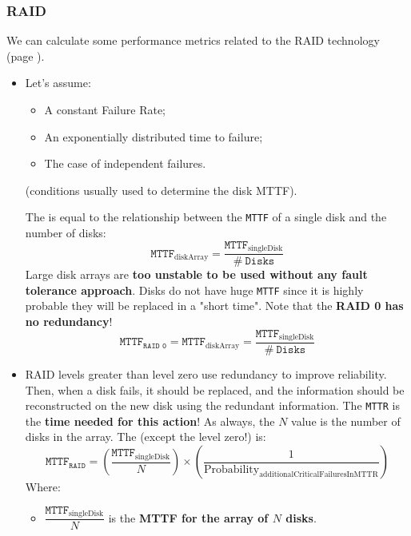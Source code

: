 \newpage

\subsubsection{RAID}

We can calculate some performance metrics related to the RAID technology (page \pageref{paragraph: RAID}).
\begin{itemize}
    \item Let's assume:
    \begin{itemize}
        \item A constant Failure Rate;
        \item An exponentially distributed time to failure;
        \item The case of independent failures.
    \end{itemize}
    (conditions usually used to determine the disk MTTF). 
    
    The  is equal to the relationship between the \texttt{MTTF} of a single disk and the number of disks:
    \begin{equation}\label{eq: Mean Time To Failure of a disk array}
        \texttt{MTTF}_{\text{diskArray}} = \dfrac{\texttt{MTTF}_{\text{singleDisk}}}{\# \: \texttt{Disks}}
    \end{equation}
    Large disk arrays are \textbf{too unstable to be used without any fault tolerance approach}. Disks do not have huge \texttt{MTTF} since it is highly probable they will be replaced in a "short time". Note that the \textbf{RAID 0 has no redundancy}!
    \begin{equation}
        \texttt{MTTF}_{\texttt{RAID 0}} = \texttt{MTTF}_{\text{diskArray}} = \dfrac{\texttt{MTTF}_{\text{singleDisk}}}{\# \: \texttt{Disks}}
    \end{equation}


    \item RAID levels greater than level zero use redundancy to improve reliability. Then, when a disk fails, it should be replaced, and the information should be reconstructed on the new disk using the redundant information. The \texttt{MTTR} is the \textbf{time needed for this action}! As always, the $N$ value is the number of disks in the array. The  (except the level zero!) is:
    \begin{equation}\label{eq: Mean Time To Failure of a RAID}
        \texttt{MTTF}_{\texttt{RAID}} = \left(\dfrac{\texttt{MTTF}_{\text{singleDisk}}}{N}\right) \times \left(\dfrac{1}{\text{Probability}_{\text{additionalCriticalFailuresInMTTR}}}\right)
    \end{equation}
    Where:
    \begin{itemize}
        \item $\dfrac{\texttt{MTTF}_{\text{singleDisk}}}{N}$ is the \textbf{MTTF for the array of $N$ disks}.
        

\end{itemize}
\end{itemize}
